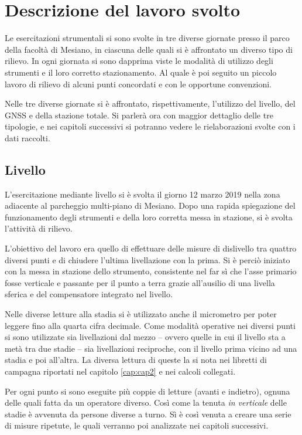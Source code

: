\chapter{Descrizione del lavoro svolto}
\setcounter{page}{1}
Le esercitazioni strumentali si sono svolte in tre diverse giornate presso il  parco della facoltà di Mesiano, in ciascuna delle quali si è affrontato un diverso tipo di rilievo.
In ogni giornata si sono dapprima viste le modalità di utilizzo degli strumenti e il loro corretto stazionamento.
Al quale è poi seguito un piccolo lavoro di rilievo di alcuni punti concordati e con le opportune convenzioni.

Nelle tre diverse giornate si è affrontato, rispettivamente, l'utilizzo del livello, del GNSS e della stazione totale. 
Si parlerà ora con maggior dettaglio delle tre tipologie, e nei capitoli successivi si potranno vedere le rielaborazioni svolte con i dati raccolti.
\section{Livello}
L'esercitazione mediante livello si è svolta il giorno 12 marzo 2019 nella zona adiacente al parcheggio multi-piano di Mesiano.
Dopo una rapida spiegazione del funzionamento degli strumenti e della loro corretta messa in stazione, si è svolta l'attività di rilievo. 

L'obiettivo del lavoro era quello di effettuare delle misure di dislivello tra quattro diversi punti e di chiudere l'ultima livellazione con la prima. 
Si è perciò iniziato con la messa in stazione dello strumento, consistente nel far sì che l'asse primario fosse verticale e passante per il punto a terra grazie all'ausilio di una livella sferica e del compensatore integrato nel livello.  

Nelle diverse letture alla stadia si è utilizzato anche il micrometro per poter leggere fino alla quarta cifra decimale.
Come modalità operative nei diversi punti si sono utilizzate sia livellazioni dal mezzo -- ovvero quelle in cui il livello sta a metà tra due stadie -- sia livellazioni reciproche, con il livello prima vicino ad una stadia e poi all'altra.
La diversa lettura di queste la si nota nei libretti di campagna riportati nel  capitolo \ref{cap:cap2} e nei calcoli collegati. 

Per ogni punto si sono eseguite più coppie di letture (avanti e indietro), ognuna delle quali fatta da un operatore diverso. Così come la tenuta \emph{in verticale} delle stadie è avvenuta da persone diverse a turno. 
Sì è così venuta a creare una serie di misure ripetute, le quali verranno poi analizzate nei capitoli successivi.
